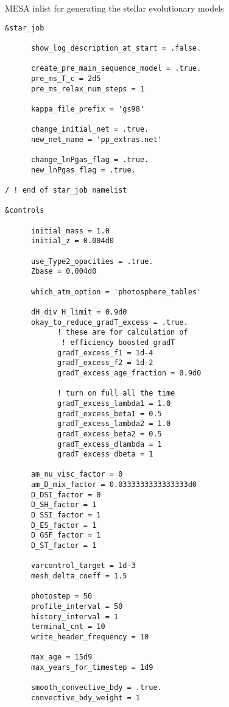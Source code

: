 \documentclass[useAMS,usenatbib]{mnras}
\begin{document}
\begin{table*}
\caption{MESA inlist for generating the stellar evolutionary models}
\label{tab:inlist}
\begin{multicols}{2}
{\scriptsize
\begin{verbatim}
&star_job

      show_log_description_at_start = .false.
      
      create_pre_main_sequence_model = .true.
      pre_ms_T_c = 2d5
      pre_ms_relax_num_steps = 1 

      kappa_file_prefix = 'gs98'

      change_initial_net = .true.      
      new_net_name = 'pp_extras.net'
      
      change_lnPgas_flag = .true.
      new_lnPgas_flag = .true.

/ ! end of star_job namelist

&controls

      initial_mass = 1.0
      initial_z = 0.004d0
      
      use_Type2_opacities = .true.
      Zbase = 0.004d0

      which_atm_option = 'photosphere_tables'
      
      dH_div_H_limit = 0.9d0
      okay_to_reduce_gradT_excess = .true.
            ! these are for calculation of 
             ! efficiency boosted gradT
            gradT_excess_f1 = 1d-4
            gradT_excess_f2 = 1d-2
            gradT_excess_age_fraction = 0.9d0
            
            ! turn on full all the time
            gradT_excess_lambda1 = 1.0
            gradT_excess_beta1 = 0.5
            gradT_excess_lambda2 = 1.0
            gradT_excess_beta2 = 0.5
            gradT_excess_dlambda = 1
            gradT_excess_dbeta = 1

      am_nu_visc_factor = 0
      am_D_mix_factor = 0.0333333333333333d0
      D_DSI_factor = 0
      D_SH_factor = 1
      D_SSI_factor = 1
      D_ES_factor = 1
      D_GSF_factor = 1
      D_ST_factor = 1
      
      varcontrol_target = 1d-3
      mesh_delta_coeff = 1.5

      photostep = 50
      profile_interval = 50
      history_interval = 1
      terminal_cnt = 10
      write_header_frequency = 10

      max_age = 15d9
      max_years_for_timestep = 1d9

      smooth_convective_bdy = .true.                  
      convective_bdy_weight = 1


\end{verbatim}}
\end{multicols}
\end{table*}
\end{document}
